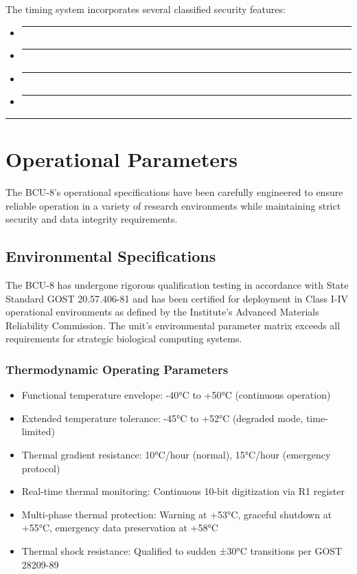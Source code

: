 \documentclass[12pt]{article}
\begin{document}
The timing system incorporates several classified security features:
\begin{itemize}
    \item \rule{85mm}{3.5mm}
    \item \rule{85mm}{3.5mm}
    \item \rule{85mm}{3.5mm}
    \item \rule{85mm}{3.5mm}
\end{itemize}

\begin{center}
\textcolor{sovietred}{\rule{0.8\textwidth}{0.4pt}}
\end{center}

\section{Operational Parameters}
The BCU-8's operational specifications have been carefully engineered to ensure reliable operation in a variety of research environments while maintaining strict security and data integrity requirements.

\subsection{Environmental Specifications}
The BCU-8 has undergone rigorous qualification testing in accordance with State Standard GOST 20.57.406-81 and has been certified for deployment in Class I-IV operational environments as defined by the Institute's Advanced Materials Reliability Commission. The unit's environmental parameter matrix exceeds all requirements for strategic biological computing systems.

\subsubsection{Thermodynamic Operating Parameters}
\begin{itemize}
    \item Functional temperature envelope: -40°C to +50°C (continuous operation)
    \item Extended temperature tolerance: -45°C to +52°C (degraded mode, time-limited)
    \item Thermal gradient resistance: 10°C/hour (normal), 15°C/hour (emergency protocol)
    \item Real-time thermal monitoring: Continuous 10-bit digitization via R1 register
    \item Multi-phase thermal protection: Warning at +53°C, graceful shutdown at +55°C, emergency data preservation at +58°C
    \item Thermal shock resistance: Qualified to sudden ±30°C transitions per GOST 28209-89
\end{itemize}
\end{document}

